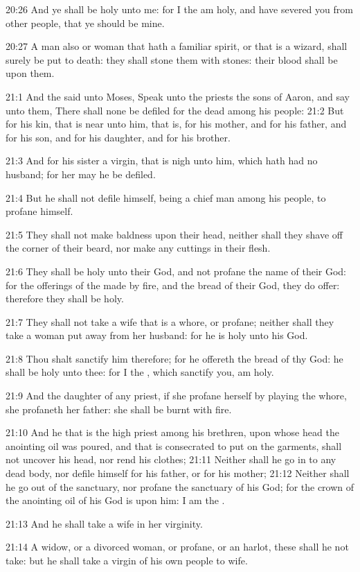 20:26 And ye shall be holy unto me: for I the \LORD am holy, and have severed you from other people, that ye should be mine.

20:27 A man also or woman that hath a familiar spirit, or that is a wizard, shall surely be put to death: they shall stone them with stones: their blood shall be upon them.

21:1 And the \LORD said unto Moses, Speak unto the priests the sons of Aaron, and say unto them, There shall none be defiled for the dead among his people: 21:2 But for his kin, that is near unto him, that is, for his mother, and for his father, and for his son, and for his daughter, and for his brother.

21:3 And for his sister a virgin, that is nigh unto him, which hath had no husband; for her may he be defiled.

21:4 But he shall not defile himself, being a chief man among his people, to profane himself.

21:5 They shall not make baldness upon their head, neither shall they shave off the corner of their beard, nor make any cuttings in their flesh.

21:6 They shall be holy unto their God, and not profane the name of their God: for the offerings of the \LORD made by fire, and the bread of their God, they do offer: therefore they shall be holy.

21:7 They shall not take a wife that is a whore, or profane; neither shall they take a woman put away from her husband: for he is holy unto his God.

21:8 Thou shalt sanctify him therefore; for he offereth the bread of thy God: he shall be holy unto thee: for I the \LORD, which sanctify you, am holy.

21:9 And the daughter of any priest, if she profane herself by playing the whore, she profaneth her father: she shall be burnt with fire.

21:10 And he that is the high priest among his brethren, upon whose head the anointing oil was poured, and that is consecrated to put on the garments, shall not uncover his head, nor rend his clothes; 21:11 Neither shall he go in to any dead body, nor defile himself for his father, or for his mother; 21:12 Neither shall he go out of the sanctuary, nor profane the sanctuary of his God; for the crown of the anointing oil of his God is upon him: I am the \LORD.

21:13 And he shall take a wife in her virginity.

21:14 A widow, or a divorced woman, or profane, or an harlot, these shall he not take: but he shall take a virgin of his own people to wife.

